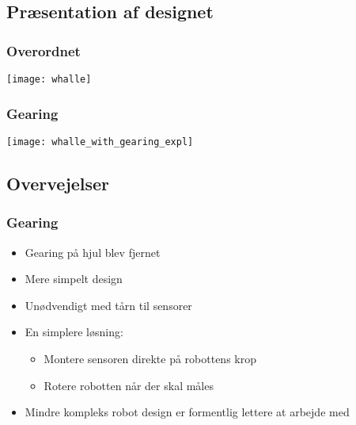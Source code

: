 \subsection{Præsentation af designet}
\begin{frame}
\frametitle{Overordnet}
\begin{center}
\texttt{[image: whalle]}
\end{center}
\end{frame}

\begin{frame}
\frametitle{Gearing}
\begin{center}
\texttt{[image: whalle\_with\_gearing\_expl]}
\end{center}

\end{frame}

\subsection{Overvejelser}
\begin{frame}
\frametitle{Gearing}
\begin{itemize}
\item Gearing på hjul blev fjernet
\item Mere simpelt design
\item Unødvendigt med tårn til sensorer
\item En simplere løsning:
\begin{itemize}
\item Montere sensoren direkte på robottens krop
\item Rotere robotten når der skal måles
\end{itemize} 
\item Mindre kompleks robot design er formentlig lettere at arbejde med
\end{itemize}
\end{frame}


